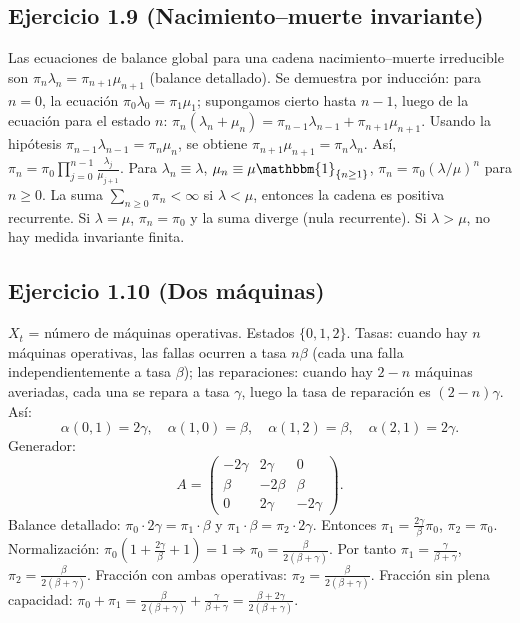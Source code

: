 \documentclass[letterpaper, 12pt]{article}
\newcommand{\1}{\mathbbm{1}}
\begin{document}
    \subsection{Ejercicio 1.9 (Nacimiento--muerte invariante)}
    Las ecuaciones de balance global para una cadena nacimiento--muerte irreducible son $\pi_n\lambda_n=\pi_{n+1}\mu_{n+1}$ (balance detallado). Se demuestra por inducci\'on: para $n=0$, la ecuaci\'on $\pi_0\lambda_0=\pi_1\mu_1$; supongamos cierto hasta $n-1$, luego de la ecuaci\'on para el estado $n$: $\pi_n(\lambda_n+\mu_n)=\pi_{n-1}\lambda_{n-1}+\pi_{n+1}\mu_{n+1}$. Usando la hip\'otesis $\pi_{n-1}\lambda_{n-1}=\pi_n\mu_n$, se obtiene $\pi_{n+1}\mu_{n+1}=\pi_n\lambda_n$. As\'i, $\pi_n=\pi_0\prod_{j=0}^{n-1}\frac{\lambda_j}{\mu_{j+1}}$. Para $\lambda_n\equiv\lambda$, $\mu_n\equiv\mu\1_{\{n\ge1\}}$, $\pi_n=\pi_0(\lambda/\mu)^n$ para $n\ge0$. La suma $\sum_{n\ge0}\pi_n<\infty$ si $\lambda<\mu$, entonces la cadena es positiva recurrente. Si $\lambda=\mu$, $\pi_n=\pi_0$ y la suma diverge (nula recurrente). Si $\lambda>\mu$, no hay medida invariante finita.

    \subsection{Ejercicio 1.10 (Dos m\'aquinas)}
    $X_t$ = n\'umero de m\'aquinas operativas. Estados $\{0,1,2\}$. Tasas: cuando hay $n$ m\'aquinas operativas, las fallas ocurren a tasa $n\beta$ (cada una falla independientemente a tasa $\beta$); las reparaciones: cuando hay $2-n$ m\'aquinas averiadas, cada una se repara a tasa $\gamma$, luego la tasa de reparaci\'on es $(2-n)\gamma$. As\'i:
    \[
    \alpha(0,1)=2\gamma,\quad \alpha(1,0)=\beta,\quad \alpha(1,2)=\beta,\quad \alpha(2,1)=2\gamma.
    \]
    Generador:
    \[
    A=\begin{pmatrix}
    -2\gamma & 2\gamma & 0\\
    \beta & -2\beta & \beta\\
    0 & 2\gamma & -2\gamma
    \end{pmatrix}.
    \]
    Balance detallado: $\pi_0\cdot2\gamma=\pi_1\cdot\beta$ y $\pi_1\cdot\beta=\pi_2\cdot2\gamma$. Entonces $\pi_1=\frac{2\gamma}{\beta}\pi_0$, $\pi_2=\pi_0$. Normalizaci\'on: $\pi_0(1+\frac{2\gamma}{\beta}+1)=1\Rightarrow\pi_0=\frac{\beta}{2(\beta+\gamma)}$. Por tanto $\pi_1=\frac{\gamma}{\beta+\gamma}$, $\pi_2=\frac{\beta}{2(\beta+\gamma)}$. Fracci\'on con ambas operativas: $\pi_2=\frac{\beta}{2(\beta+\gamma)}$. Fracci\'on sin plena capacidad: $\pi_0+\pi_1=\frac{\beta}{2(\beta+\gamma)}+\frac{\gamma}{\beta+\gamma}=\frac{\beta+2\gamma}{2(\beta+\gamma)}$.
\end{document}
